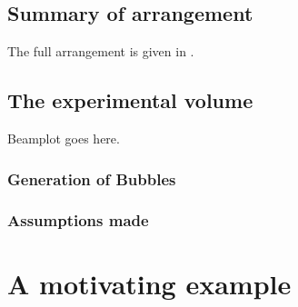 \subsection{Summary of arrangement}
The full arrangement is given in .





\subsection{The experimental volume}

Beamplot goes here.

\subsubsection{Generation of Bubbles}

\subsubsection{Assumptions made}









\section{A motivating  example}\label{sec:WE:motivating_ex}

